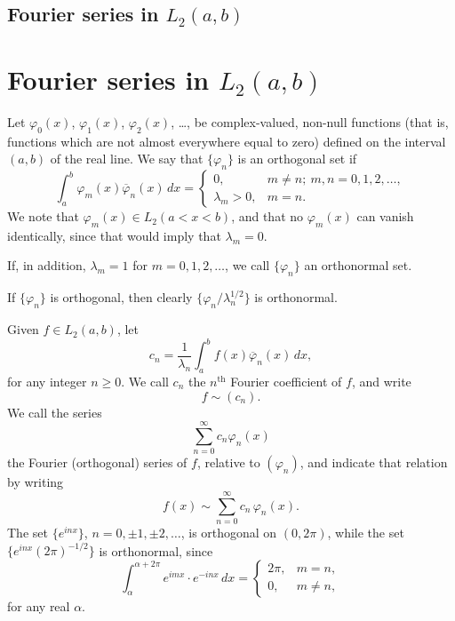 \subsection*{Fourier series in $L_{2}(a,b)$}
\setcounter{section}{7}
\section{Fourier series in \texorpdfstring{$L_2(a,b)$}{L2(a,b)}}
\label{sec:II-8}

\noindent Let $\varphi_{0}(x)$, $\varphi_{1}(x)$, $\varphi_{2}(x)$, \dots, be complex-valued, non-null functions (that is, functions which are not almost everywhere equal to zero) defined on the interval $(a,b)$ of the real line. We say that $\{\varphi_{n}\}$ is an orthogonal set if
\[
\int_{a}^{b}\varphi_{m}(x)\overline{\varphi}_{n}(x)\,dx=
\begin{cases}
0, & m\neq n;\ m,n=0,1,2,\dots,\\
\lambda_{m}>0, & m=n.
\end{cases}
\]
We note that $\varphi_{m}(x)\in L_{2}(a<x<b)$, and that no $\varphi_{m}(x)$ can vanish identically, since that would imply that $\lambda_{m}=0$.

If, in addition, $\lambda_{m}=1$ for $m=0,1,2,\dots$, we call $\{\varphi_{n}\}$ an orthonormal set.

If $\{\varphi_{n}\}$ is orthogonal, then clearly $\{\varphi_{n}/\lambda_{n}^{1/2}\}$ is orthonormal.

Given $f\in L_{2}(a,b)$, let
\[
c_{n}=\frac{1}{\lambda_{n}}\int_{a}^{b}f(x)\overline{\varphi}_{n}(x)\,dx,
\]
for any integer $n\ge 0$. We call $c_{n}$ the $n^{\text{th}}$ Fourier coefficient of $f$, and write
\begin{equation}\tag{8.1}\label{eq:II-8.1}
f\sim(c_{n}).
\end{equation}
We call the series
\[
\sum_{n=0}^{\infty}c_{n}\varphi_{n}(x)
\]
the Fourier (orthogonal) series of $f$, relative to $(\varphi_{n})$, and indicate that relation by writing
\begin{equation}\tag{8.2}\label{eq:II-8.2}
f(x)\sim\sum_{n=0}^{\infty}c_{n}\,\varphi_{n}(x).
\end{equation}
The set $\{e^{inx}\}$, $n=0,\pm1,\pm2,\dots$, is orthogonal on $(0,2\pi)$, while the set $\{e^{inx}(2\pi)^{-1/2}\}$ is orthonormal, since
\[
\int_{\alpha}^{\alpha+2\pi}e^{imx}\cdot e^{-inx}\,dx=
\begin{cases}
2\pi, & m=n,\\
0, & m\neq n,
\end{cases}
\]
for any real $\alpha$.

